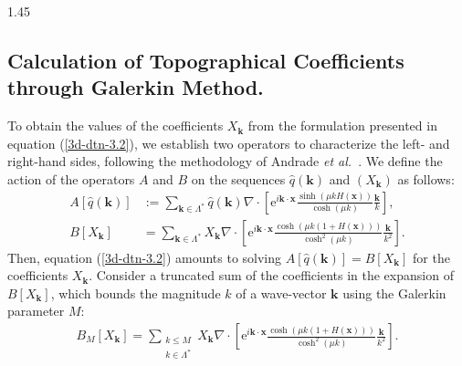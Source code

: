 \documentclass[12pt,titlepage]{article}
\theoremstyle{definition}
\theoremstyle{remark}
\newcommand{\M}[1]{\mathbf{#1}}
\begin{document}
\begin{spacing}{1.45}
\subsection{Calculation of Topographical Coefficients through Galerkin Method.}


To obtain the values of the coefficients $X_{\M{k}}$ from the formulation presented in equation (\ref{3d-dtn-3.2}), we establish two operators to characterize the left- and right-hand sides, following the methodology of Andrade \textit{et al.}\ \cite{andrade2018three}. We define the action of the operators $A$ and $B$ on the sequences $\hat{q}(\M{k})$ and $(X_{\M{k}})$ as follows:
\begin{align*}
    A[\hat{q}(\M{k})] &:= \sum_{\M{k} \in \Lambda^*} \hat{q}(\M{k}) \nabla \cdot \left[ \mathrm{e}^{i \M{k} \cdot \M{x}}  \frac{\sinh(\mu k H(\M{x}) )}{\cosh(\mu k)} \frac{\M{k}}{k} \right], \\
    B[X_{\M{k}}] &= \sum_{\M{k} \in \Lambda^*} X_{\M{k}} \nabla \cdot \left[ \mathrm{e}^{i \M{k} \cdot \M{x}} \frac{\cosh(\mu k (1 + H(\M{x}) ))}{\cosh^2(\mu k)} \frac{\M{k}}{k^2} \right].
\end{align*}
Then, equation (\ref{3d-dtn-3.2}) amounts to solving $A[\hat{q}({\M{k}})] = B[X_{\M{k}}]$ for the coefficients $X_{\M{k}}$. Consider a truncated sum of the coefficients in the expansion of $B[X_{\M{k}}]$, which bounds the magnitude $k$ of a wave-vector $\M{k}$ using the Galerkin parameter $M$: 
\begin{align*}
    B_M [X_{\M{k}}] = \sum_{\substack{k \leq M \\ k \in \Lambda^*}} X_{\M{k}} \nabla \cdot \left[ \mathrm{e}^{i \M{k} \cdot \M{x}} \frac{\cosh(\mu k (1 + H(\M{x}) ))}{\cosh^2(\mu k)} \frac{\M{k}}{k^2} \right].
\end{align*}


\end{spacing}
\end{document}
